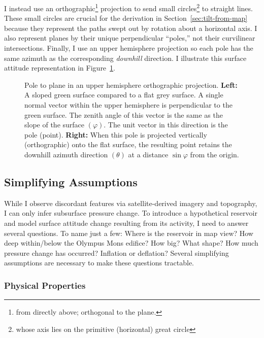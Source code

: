 I instead use an orthographic\footnote{from directly above; orthogonal to the plane.} projection to send small circles\footnote{whose axis lies on the primitive (horizontal) great circle} to straight lines. These small circles are crucial for the derivation in Section~\ref{sec:tilt-from-map} because they represent the paths swept out by rotation about a horizontal axis. I also represent planes by their unique perpendicular ``poles,'' not their curvilinear intersections. Finally, I use an upper hemisphere projection so each pole has the same azimuth as the corresponding \emph{downhill} direction. I illustrate this surface attitude representation in Figure~\ref{fig:surface}.

\begin{figure}
    \caption[Orthographic pole to plane]{Pole to plane in an upper hemisphere orthographic projection. \textbf{Left:} A sloped green surface compared to a flat grey surface. A single normal vector within the upper hemisphere is perpendicular to the green surface. The zenith angle of this vector is the same as the slope of the surface $(\varphi)$. The unit vector in this direction is the pole (point). \textbf{Right:} When this pole is projected vertically (orthographic) onto the flat surface, the resulting point retains the downhill azimuth direction $(\theta)$ at a distance $\sin\varphi$ from the origin.}%
    \label{fig:surface}%
\end{figure}

\subsection{Simplifying Assumptions}

While I observe discordant features via satellite-derived imagery and topography, I can only infer subsurface pressure change. To introduce a hypothetical reservoir and model surface attitude change resulting from its activity, I need to answer several questions. To name just a few: Where is the reservoir in map view? How deep within/below the Olympus Mons edifice? How big? What shape? How much pressure change has occurred? Inflation or deflation? Several simplifying assumptions are necessary to make these questions tractable.

\subsubsection{Physical Properties}

